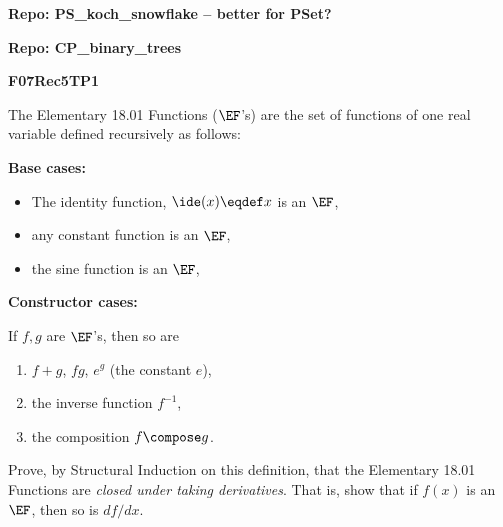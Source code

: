 \documentclass[handout]{mcs}
\begin{document}


\large\textbf{Repo: PS\_koch\_snowflake -- better for PSet?}

\large\textbf{Repo: CP\_binary\_trees}

\large\textbf{F07Rec5TP1}

\begin{problem}
The Elementary 18.01 Functions ($\EF$'s) are the set of functions of
one real variable defined recursively as follows:

\textbf{Base cases:}
\begin{itemize}


\item The identity function, $\ide(x) \eqdef x$ is an $\EF$,

\item any constant function is an $\EF$,

\item the sine function is an $\EF$,

\end{itemize}

\textbf{Constructor cases:}

If $f,g$ are $\EF$'s, then so are
\begin{enumerate}

\item $f + g$, $fg$, $e^g$ (the constant $e$),\label{+-}

\item the inverse function $f^{-1}$,\label{inversefunc}

\item the composition $f \compose g$.\label{cmp}
\end{enumerate}

Prove, by Structural Induction on this definition, that the Elementary
18.01 Functions are \emph{closed under taking derivatives}.  That is, 
show
that if $f(x)$ is an $\EF$, then so is $df/dx$.

\end{problem}
\end{document}
